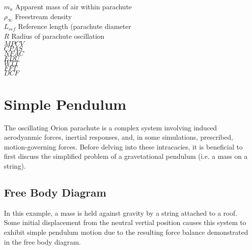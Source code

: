 \documentclass[]{aiaa-tc}%
\begin{document}
\begin{multicols}{2}
\begin{tabbing}
  $m_a$               \> Apparent mass of air within parachute \\

  $\rho_{\infty}$     \> Freestream density \\
  $L_{ref}$           \> Reference length (parachute diameter\\
  $R$                 \> Radius of parachute oscillation \\

  $MPCV$ \\
  $CPAS$ \\
  $NFAC$ \\
  $EDU$ \\
  $WTT$ \\
  $FFT$ \\
  $DCF$ \\

 \end{tabbing}

 \end{multicols}

\section{Simple Pendulum} %

The oscillating Orion parachute is a complex system involving induced aerodyanmic forces, inertial responses, and, in some simulations, prescribed, motion-governing forces.  Before delving into these intracacies, it is beneficial to first discuss the simplified problem of a gravetational pendulum (i.e. a mass on a string).


\subsection{Free Body Diagram}

In this example, a mass is held against gravity by a string attached to a roof.  Some initial displacement from the neutral vertial position causes this system to exhibit simple pendulum motion due to the resulting force balance demonstrated in the free body diagram.

% 
\end{document}
